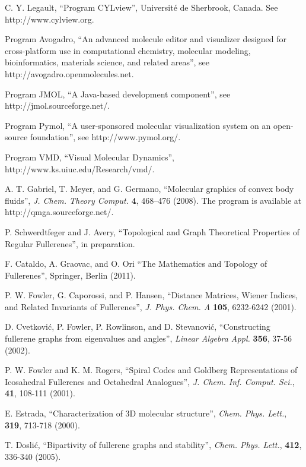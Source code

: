 \documentclass[article,a4paper,twoside]{memoir}
\begin{document}
\begin{thebibliography}{99}
 C. Y. Legault, ``Program CYLview'', Universit\'e de Sherbrook, Canada. See http://www.cylview.org.

 Program Avogadro, ``An advanced molecule editor and visualizer designed for cross-platform use in computational chemistry, molecular modeling, bioinformatics, materials science, and related areas'', see http://avogadro.openmolecules.net.

 Program JMOL, ``A Java-based development component'', see http://jmol.sourceforge.net/.

 Program Pymol, ``A user-sponsored molecular visualization system on an open-source foundation'', see http://www.pymol.org/.

 Program VMD, ``Visual Molecular Dynamics'', http://www.ks.uiuc.edu/Research/vmd/.

 A. T. Gabriel, T. Meyer, and G. Germano, 
``Molecular graphics of convex body fluids'', \textit{J. Chem. Theory Comput.}
\textbf{4}, 468--476 (2008). The program is available at http://qmga.sourceforge.net/.

 P. Schwerdtfeger and J. Avery, ``Topological and Graph Theoretical Properties of Regular Fullerenes'', in preparation.

 F. Cataldo, A. Graovac, and O. Ori ``The Mathematics and Topology of Fullerenes'', Springer, Berlin (2011).

 P. W. Fowler, G. Caporossi, and P. Hansen, ``Distance Matrices, Wiener Indices, and Related Invariants of Fullerenes'', 
\textit{J. Phys. Chem. A} \textbf{105}, 6232-6242 (2001).

 D. Cvetkovi\'c, P. Fowler, P. Rowlinson, and D. Stevanovi\'c, ``Constructing fullerene graphs from eigenvalues and angles'',
\textit{Linear Algebra Appl.} \textbf{356}, 37-56 (2002).

 P. W. Fowler and K. M. Rogers, ``Spiral Codes and Goldberg Representations of Icosahedral Fullerenes and Octahedral
Analogues'', \textit{J. Chem. Inf. Comput. Sci.}, \textbf{41}, 108-111 (2001).

 E. Estrada, ``Characterization of 3D molecular structure'', \textit{Chem. Phys. Lett.}, \textbf{319}, 713-718 (2000).

 T. Dosli\'c, ``Bipartivity of fullerene graphs and stability'', \textit{Chem. Phys. Lett.}, \textbf{412}, 336-340 (2005).


\end{thebibliography}
\end{document}
